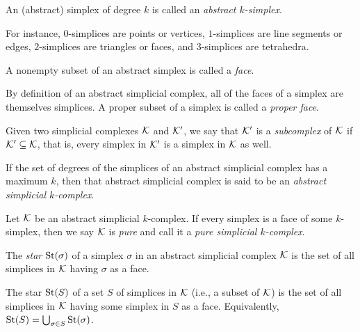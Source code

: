 \begin{definition}\label{def:k_simplices}
    An (abstract) simplex of degree $k$ is called an \emph{abstract $k$-simplex}.
\end{definition}
For instance, $0$-simplices are points or vertices, $1$-simplices are line segments or edges, $2$-simplices are triangles or faces, and $3$-simplices are tetrahedra. %

\begin{definition}\label{def:face} %
    A nonempty subset of an abstract simplex is called a \emph{face}.
\end{definition}
By definition of an abstract simplicial complex, all of the faces of a simplex are themselves simplices. A proper subset of a simplex is called a \emph{proper face}.

\begin{definition}\label{def:subcomplex}
    Given two simplicial complexes $\mathcal{K}$ and $\mathcal{K}'$, we say that $\mathcal{K}'$ is a \emph{subcomplex} of $\mathcal{K}$ if $\mathcal{K}' \subseteq \mathcal{K}$, that is, every simplex in $\mathcal{K}'$ is a simplex in $\mathcal{K}$ as well.
\end{definition}

\begin{definition}\label{def:abstract_simplicial_k-complex}
    If the set of degrees of the simplices of an abstract simplicial complex has a maximum $k$, then that abstract simplicial complex is said to be an \emph{abstract simplicial $k$-complex}.
\end{definition}

\begin{definition}\label{def:pure_abstract_simplicial_k-complex}
    Let $\mathcal{K}$ be an abstract simplicial $k$-complex. If every simplex is a face of some $k$-simplex, then we say $\mathcal{K}$ is \emph{pure} and call it a \emph{pure simplicial $k$-complex}.
\end{definition}

\begin{definition}\label{def:star}
    The \emph{star} $\operatorname{St}(\sigma)$ of a simplex $\sigma$ in an abstract simplicial complex $\mathcal{K}$ is the set of all simplices in $\mathcal{K}$ having $\sigma$ as a face.

    The star $\operatorname{St}(S)$ of a set $S$ of simplices in $\mathcal{K}$ (i.e., a subset of $\mathcal{K}$) is the set of all simplices in $\mathcal{K}$ having some simplex in $S$ as a face. Equivalently, $\operatorname{St}(S) = \bigcup_{\sigma \in S} \operatorname{St}(\sigma)$.
\end{definition}

